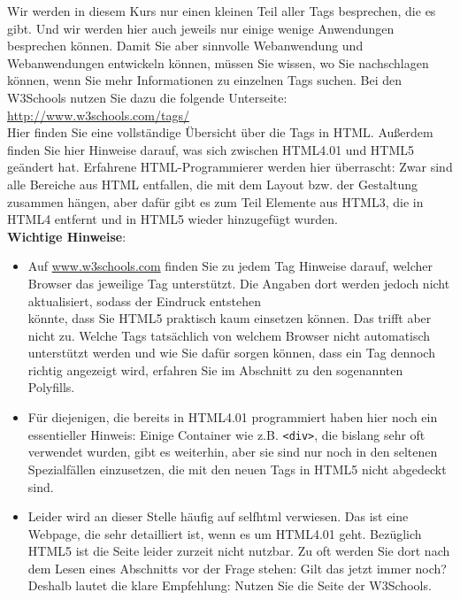 Wir werden in diesem Kurs nur einen kleinen Teil aller Tags besprechen, die es gibt. Und wir werden hier auch jeweils nur einige wenige Anwendungen besprechen können. Damit Sie aber sinnvolle Webanwendung und Webanwendungen entwickeln können, müssen Sie wissen, wo Sie nachschlagen können, wenn Sie mehr Informationen zu einzelnen Tags suchen. Bei den W3Schools nutzen Sie dazu die folgende Unterseite: \url{http://www.w3schools.com/tags/}\\

Hier finden Sie eine vollständige Übersicht über die Tags in HTML. Außerdem finden Sie hier Hinweise darauf, was sich zwischen HTML4.01 und HTML5 geändert hat. Erfahrene HTML-Programmierer werden hier überrascht: Zwar sind alle Bereiche aus HTML entfallen, die mit dem Layout bzw. der Gestaltung zusammen hängen, aber dafür gibt es zum Teil Elemente aus HTML3, die in HTML4 entfernt und in HTML5 wieder hinzugefügt wurden.\\

\textbf{Wichtige Hinweise}:

\begin{itemize}
	\item Auf \url{www.w3schools.com} finden Sie zu jedem Tag Hinweise darauf, welcher Browser das jeweilige Tag unterstützt. Die Angaben dort werden jedoch nicht aktualisiert, sodass der Eindruck entstehen\\ könnte, dass Sie HTML5 praktisch kaum einsetzen können. Das trifft aber nicht zu. Welche Tags tatsächlich von welchem Browser nicht automatisch unterstützt werden und wie Sie dafür sorgen können, dass ein Tag dennoch richtig angezeigt wird, erfahren Sie im Abschnitt zu den sogenannten Polyfills.
	\item Für diejenigen, die bereits in HTML4.01 programmiert haben hier noch ein essentieller Hinweis: Einige Container wie z.B. \verb|<div>|, die bislang sehr oft verwendet wurden, gibt es weiterhin, aber sie sind nur noch in den seltenen Spezialfällen einzusetzen, die mit den neuen Tags in HTML5 nicht abgedeckt sind.
	\item Leider wird an dieser Stelle häufig auf selfhtml verwiesen. Das ist eine Webpage, die sehr detailliert ist, wenn es um HTML4.01 geht. Bezüglich HTML5 ist die Seite leider zurzeit nicht nutzbar. Zu oft werden Sie dort nach dem Lesen eines Abschnitts vor der Frage stehen: Gilt das jetzt immer noch? Deshalb lautet die klare Empfehlung: Nutzen Sie die Seite der W3Schools.
\end{itemize}

